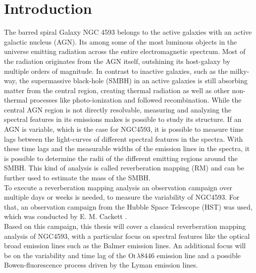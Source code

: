 \chapter{Introduction}

The barred spiral Galaxy NGC 4593 belongs to the active galaxies with an active galactic nucleus (AGN). Its among some of the most luminous objects in the universe emitting radiation across the entire electromagnetic spectrum. Most of the radiation originates from the AGN itself, outshining its host-galaxy by multiple orders of magnitude. In contrast to inactive galaxies, such as the milky-way, the supermassive black-hole (SMBH) in an active galaxies is still absorbing matter from the central region, creating thermal radiation as well as other non-thermal processes like photo-ionization and followed recombination. While the central AGN region is not directly resolvable, measuring and analyzing the spectral features in its emissions makes is possible to study its structure. If an AGN is variable, which is the case for NGC4593, it is possible to measure time lags between the light-curves of different spectral features in the spectra. With these time lags and the measurable widths of the emission lines  in the spectra, it is possible to determine the radii of the different emitting regions around the SMBH. This kind of analysis is called reverberation mapping (RM) and can be further used to estimate the mass of the SMBH. \\
To execute a reverberation mapping analysis an observation campaign over multiple days or weeks is needed, to measure the variability of NGC4593. For that, an observation campaign from the Hubble Space Telescope (HST) was used, which was conducted by E. M. Cackett \parencite{cackett2018accretion}.\\
Based on this campaign, this thesis will cover a classical reverberation mapping analysis of NGC4593, with a particular focus on spectral features like the optical broad emission lines such as the Balmer emission lines. An additional focus will be on the variability and time lag of the  O\textsc{i}$\,\lambda8446$ emission line and a possible Bowen-fluorescence process driven by the Lyman emission lines.
